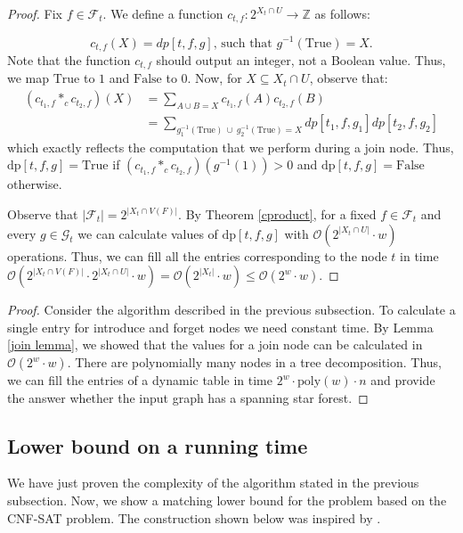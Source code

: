 \documentclass[en]{pracamgr}
\theoremstyle{definition}
\newcommand{\ssf}{spanning star forest}
\newcommand{\cnfsat}{{\sc CNF-SAT}}
\newcommand{\dpt}[1]{\textrm{dp}[#1]}
\newcommand{\true}{\textrm{True}}
\newcommand{\false}{\textrm{False}}
\begin{document}
\begin{proof}
	Fix $f \in \mathcal{F}_t$. We define a function $c_{t,f}:2^{X_t \cap U} \rightarrow \mathbb{Z}$ as follows:
	
	\begin{equation*}
		c_{t,f}(X) = dp[t,f,g] \text{, such that $g^{-1}(\true) = X$}.
	\end{equation*}	
	Note that the function $c_{t,f}$ should output an integer, not a Boolean value. Thus, we map $\true$ to $1$ and $\false$ to $0$. Now, for $X \subseteq X_t \cap U$, observe that: 
	\begin{align*}
		(c_{t_1,f} *_c c_{t_2,f})(X) &= \sum\limits_{A \cup B = X} c_{t_1,f}(A)c_{t_2,f}(B) \\
		&= \sum\limits_{ g_1^{-1}(\true)\ \cup\ g_2^{-1}(\true) = X} dp[t_1,f,g_1]dp[t_2,f,g_2]	
	\end{align*}
	which exactly reflects the computation that we perform during a join node. Thus, $\dpt{t,f,g} = \true$ if $(c_{t_1,f} *_c c_{t_2,f})(g^{-1}(1)) > 0$ and $\dpt{t,f,g} = \false$ otherwise. 
	
	Observe that $|\mathcal{F}_t| = 2^{|X_t \cap V(F)|}$. By Theorem \ref{cproduct}, for a fixed $f \in \mathcal{F}_t$ and every $g \in \mathcal{G}_t$ we can calculate values of $\dpt{t,f,g}$ with $\mathcal{O}(2^{|X_t \cap U|} \cdot w)$ operations. Thus, we can fill all the entries corresponding to the node $t$ in time $\mathcal{O}(2^{|X_t \cap V(F)|} \cdot 2^{|X_t \cap U|} \cdot w) = \mathcal{O}(2^{|X_t|} \cdot w) \leq \mathcal{O}(2^w \cdot w)$.
\end{proof}

\thmssfeptwtime*

\begin{proof}
	Consider the algorithm described in the previous subsection. To calculate a single entry for introduce and forget nodes we need constant time. By Lemma \ref{join lemma}, we showed that the values for a join node can be calculated in $\mathcal{O}(2^w \cdot w)$. There are polynomially many nodes in a tree decomposition. Thus, we can fill the entries of a dynamic table in time $2^w \cdot \textrm{poly}(w) \cdot n$ and provide the answer whether the input graph has a \ssf{}.
\end{proof}

\subsection{Lower bound on a running time}

We have just proven the complexity of the algorithm stated in the previous subsection. Now, we show a matching lower bound for the problem based on the \cnfsat{} problem. The construction shown below was inspired by \cite{TREEWIDTH}.
\end{document}

